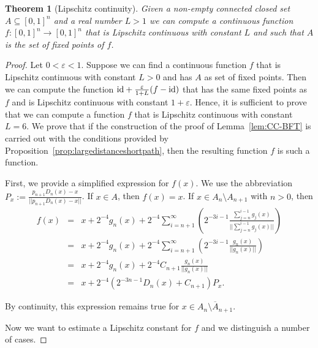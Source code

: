 \documentclass[a4paper]{amsart}
\def\In{\subseteq}
\def\id{{\rm id}}
\newtheorem{theorem}{Theorem}[section]
\theoremstyle{definition}
\begin{document}
\begin{theorem}[Lipschitz continuity]
\label{thm:Lipschitz}
Given a non-empty connected closed set $A\In[0,1]^n$ and a real number $L>1$
we can compute a continuous function ${f:[0,1]^n\to[0,1]^n}$ that is Lipschitz continuous with constant $L$
and such that $A$ is the set of fixed points of $f$. 
\end{theorem}
\begin{proof}
Let $0<\varepsilon<1$. 
Suppose we can find a continuous function $f$ that is Lipschitz continuous with constant $L>0$ and has $A$ as set of fixed points.
Then we can compute the function $\id + \frac{\varepsilon}{1 + L}(f - \id)$ that has the same fixed points as $f$ and is Lipschitz continuous with constant $1+\varepsilon$.
Hence, it is sufficient to prove that we can compute a function $f$ that is Lipschitz continuous with constant $L=6$.
We prove that if the construction of the proof of Lemma~\ref{lem:CC-BFT} is carried out with the conditions provided by Proposition~\ref{prop:largedistanceshortpath}, 
then the resulting function $f$ is such a function. 

First, we provide a simplified expression for $f(x)$. We use the abbreviation $P_x := \frac{p_{n+1}D_n(x) - x}{||p_{n+1}D_n(x) - x||}$.
If $x \in A$, then $f(x) = x$. If $x \in A_{n} \setminus A_{n +1}$ with $n>0$, then
\begin{eqnarray*}
f(x) %
& = & x + 2^{-4}g_n(x) + 2^{-4}\sum_{i = n+1}^\infty \left (2^{-3i-1} \frac{\sum_{j = n}^{i-1} g_j(x)}{||\sum_{j = n}^{i-1} g_j(x)||} \right ) \\
& = & x + 2^{-4}g_n(x) + 2^{-4}\sum_{i = n+1}^\infty \left (2^{-3i-1} \frac{g_n(x)}{||g_n(x)||} \right ) \\
& = & x + 2^{-4}g_n(x) + 2^{- 4}C_{n+1} \frac{g_n(x)}{||g_n(x)||} \\
& = & x + 2^{-4}\left (2^{-3n -1}D_{n}(x) + C_{n+1} \right) P_x.
\end{eqnarray*}

By continuity, this expression remains true for $x \in \overline{A_{n} \setminus A_{n +1}}$.

Now we want to estimate a Lipschitz constant for $f$ and we distinguish a number of cases. 


\end{proof}
\end{document}
